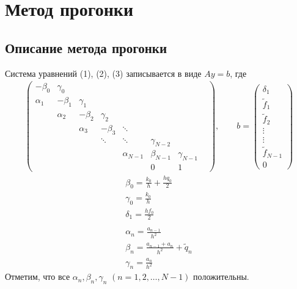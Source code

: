 \documentclass[titlepage]{article}
\begin{document}
\section{Метод прогонки}
\subsection{Описание метода прогонки}
Система уравнений (1), (2), (3) записывается в виде $Ay = b$, где 
\begin{gather}
	\begin{pmatrix}
		-\beta_0 & \gamma_0 & & & & & \\
		\alpha_1 & -\beta_1 & \gamma_1 & & & & \\
		& \alpha_2 & -\beta_2 & \gamma_2 & & & \\
		& & \alpha_3 & -\beta_3 & \ddots & & & \\
		& & & \ddots & \ddots & \gamma_{N-2} & & \\
		& & & & \alpha_{N-1} & \beta_{N-1} & \gamma_{N-1} \\
		& & & & & 0 & 1
	\end{pmatrix}
	, \qquad b = 
	\begin{pmatrix}
		\delta_1 \\ \tilde f_1 \\ \tilde f_2 \\ \vdots \\ \vdots \\ \tilde f_{N-1} \\ 0	
	\end{pmatrix}	
\end{gather}
\begin{gather*}
	\beta_0 = \frac{k_0}{h} + \frac{hq_0}{2} \\
	\gamma_0 = \frac{k_0}{h} \\
	\delta_1 = \frac{hf_0}{2} \\
	\\
	\alpha_n = \frac{a_{n-1}}{h^2} \\ 
	\beta_n = \frac{a_{n-1} + a_n}{h^2} + \tilde q_n \\
	\gamma_n = \frac{a_n}{h^2}
\end{gather*}
Отметим, что все $\alpha_n, \beta_n, \gamma_n$ $(n = 1,2,\dots,N-1)$ положительны. 
\end{document}
